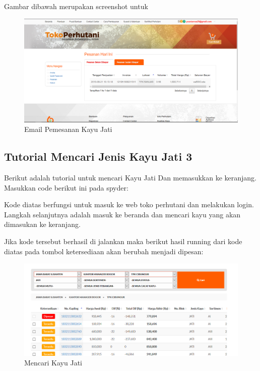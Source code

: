 Gambar dibawah merupakan screenshot untuk
\begin{figure}[h]
	\centering
	\includegraphics[scale=0.25]{figures/T6_2}
	\caption{Email Pemesanan Kayu Jati}
\end{figure}

\newpage
\subsection{Tutorial Mencari Jenis Kayu Jati 3}
Berikut adalah tutorial untuk mencari Kayu Jati Dan memasukkan ke keranjang. Masukkan code berikut ini pada spyder:


Kode diatas berfungsi untuk masuk ke web toko perhutani dan melakukan login.
Langkah selanjutnya adalah masuk ke beranda dan mencari kayu yang akan dimasukan ke keranjang.



\newpage
Jika kode tersebut berhasil di jalankan maka berikut hasil running dari kode diatas pada tombol ketersediaan akan berubah menjadi dipesan:
\begin{figure}[h]
	\centering
	\includegraphics[scale=0.3]{figures/6keranjang}
	\caption{Mencari Kayu Jati}
\end{figure}

